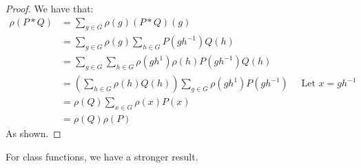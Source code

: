 \documentclass[]{article}
\theoremstyle{definition}
\numberwithin{theorem}{section}
\numberwithin{equation}{section}
\begin{document}
\begin{proof}
	We have that:
	\begin{align*}
		\rho(P \ast Q) &= \sum_{g \in G} \rho(g) (P \ast Q)(g)\\
		&= \sum_{g \in G} \rho(g) \sum_{h \in G} P(g h^{-1}) Q(h)\\
		&= \sum_{g \in G}\sum_{h \in G} \rho(gh^{1}) \rho(h)  P(g h^{-1}) Q(h)\\
		&= \left(\sum_{h \in G}  \rho(h) Q(h)\right) \sum_{g \in G} \rho(gh^{1})P(g h^{-1}) \quad \text{ Let } x = gh^{-1} \\
		&= \rho(Q) \sum_{x \in G} \rho(x) P(x)\\
		&= \rho(Q) \rho(P)
	\end{align*}
	As shown. 
\end{proof}

For class functions, we have a stronger result.
\end{document}
